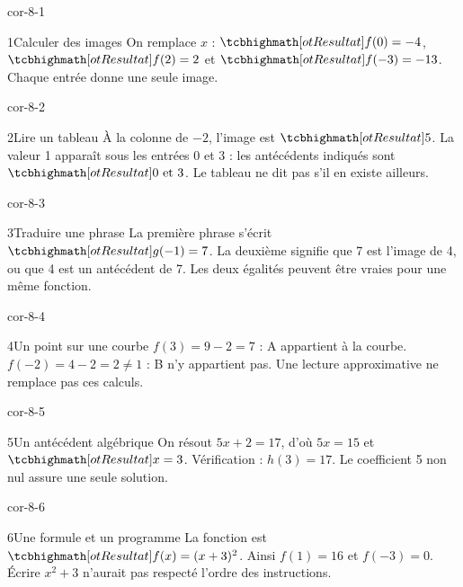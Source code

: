 \clearpage\pagestyle{otMain}\fontsize{11}{15}\selectfont{}
\begin{blocLivre}{cor-8-1}\begin{corrige}{1}{Calculer des images}
On remplace $x$ : $\res{f(0)=-4}$, $\res{f(2)=2}$ et $\res{f(-3)=-13}$. Chaque entrée donne une seule image.
\end{corrige}\end{blocLivre}
\begin{blocLivre}{cor-8-2}\begin{corrige}{2}{Lire un tableau}
À la colonne de $-2$, l’image est $\res5$. La valeur 1 apparaît sous les entrées 0 et 3 : les antécédents indiqués sont $\res{0\text{ et }3}$. Le tableau ne dit pas s’il en existe ailleurs.
\end{corrige}\end{blocLivre}
\begin{blocLivre}{cor-8-3}\begin{corrige}{3}{Traduire une phrase}
La première phrase s’écrit $\res{g(-1)=7}$. La deuxième signifie que 7 est l’image de 4, ou que 4 est un antécédent de 7. Les deux égalités peuvent être vraies pour une même fonction.
\end{corrige}\end{blocLivre}
\begin{blocLivre}{cor-8-4}\begin{corrige}{4}{Un point sur une courbe}
$f(3)=9-2=7$ : A appartient à la courbe. $f(-2)=4-2=2\ne1$ : B n’y appartient pas. Une lecture approximative ne remplace pas ces calculs.
\end{corrige}\end{blocLivre}
\begin{blocLivre}{cor-8-5}\begin{corrige}{5}{Un antécédent algébrique}
On résout $5x+2=17$, d’où $5x=15$ et $\res{x=3}$. Vérification : $h(3)=17$. Le coefficient 5 non nul assure une seule solution.
\end{corrige}\end{blocLivre}
\begin{blocLivre}{cor-8-6}\begin{corrige}{6}{Une formule et un programme}
La fonction est $\res{f(x)=(x+3)^2}$. Ainsi $f(1)=16$ et $f(-3)=0$. Écrire $x^2+3$ n’aurait pas respecté l’ordre des instructions.
\end{corrige}\end{blocLivre}
